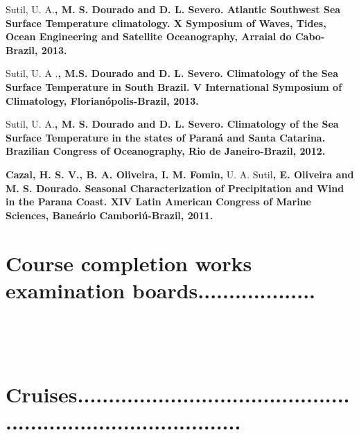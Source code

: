 \documentclass[letterpaper]{twentysecondcv} %
\begin{document}
Sutil, U. A.\textbf{, M. S. Dourado and  D. L. Severo. Atlantic Southwest Sea Surface Temperature climatology. X Symposium of Waves, Tides, Ocean Engineering and Satellite Oceanography, Arraial do Cabo-Brazil, 2013.}

Sutil, U. A .\textbf{, M.S. Dourado and D. L. Severo. Climatology of the Sea Surface Temperature in South Brazil. V International Symposium of Climatology, Florianópolis-Brazil, 2013.}

Sutil, U. A.\textbf{, M. S. Dourado and D. L. Severo. Climatology of the Sea Surface Temperature in the states of Paraná and Santa Catarina. Brazilian Congress of Oceanography,  Rio de Janeiro-Brazil, 2012.}

\textbf{Cazal, H. S. V., B. A. Oliveira, I. M. Fomin,} U. A. Sutil\textbf{, E. Oliveira and M. S. Dourado. Seasonal Characterization of Precipitation and Wind in the Parana Coast. XIV Latin American Congress of Marine Sciences, Baneário Camboriú-Brazil, 2011.}\\

\section{Course completion works examination boards\textcolor{maingray}{...................}}


\begin{twentyshort}
	\\
\end{twentyshort}
\\
\section{Cruises\textcolor{mainblue}{..................................................................................}}
\end{document}
